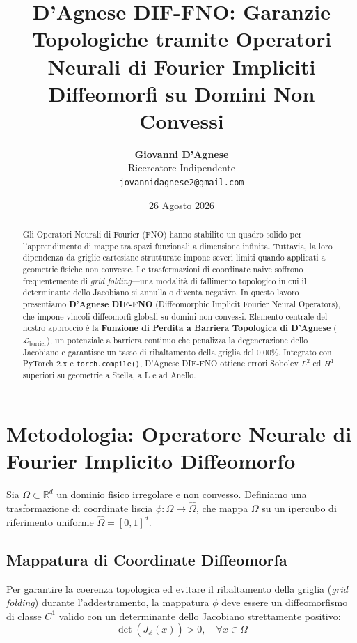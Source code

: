 \documentclass[11pt,a4paper]{article}
\title{\textbf{D'Agnese DIF-FNO: Garanzie Topologiche tramite Operatori Neurali di Fourier Impliciti Diffeomorfi su Domini Non Convessi}}
\author{\textbf{Giovanni D'Agnese} \\ Ricercatore Indipendente \\ \texttt{jovannidagnese2@gmail.com}}
\date{26 Agosto 2026}
\begin{document}
\maketitle

\begin{abstract}
Gli Operatori Neurali di Fourier (FNO) hanno stabilito un quadro solido per l'apprendimento di mappe tra spazi funzionali a dimensione infinita. Tuttavia, la loro dipendenza da griglie cartesiane strutturate impone severi limiti quando applicati a geometrie fisiche non convesse. Le trasformazioni di coordinate naive soffrono frequentemente di \textit{grid folding}—una modalità di fallimento topologico in cui il determinante dello Jacobiano si annulla o diventa negativo. In questo lavoro presentiamo \textbf{D'Agnese DIF-FNO} (Diffeomorphic Implicit Fourier Neural Operators), che impone vincoli diffeomorfi globali su domini non convessi. Elemento centrale del nostro approccio è la \textbf{Funzione di Perdita a Barriera Topologica di D'Agnese} ($\mathcal{L}_{\text{barrier}}$), un potenziale a barriera continuo che penalizza la degenerazione dello Jacobiano e garantisce un tasso di ribaltamento della griglia del 0,00\%. Integrato con PyTorch 2.x e \texttt{torch.compile()}, D'Agnese DIF-FNO ottiene errori Sobolev $L^2$ ed $H^1$ superiori su geometrie a Stella, a L e ad Anello.
\end{abstract}

\section{Metodologia: Operatore Neurale di Fourier Implicito Diffeomorfo}
\label{sec:theory}

Sia $\Omega \subset \mathbb{R}^d$ un dominio fisico irregolare e non convesso. Definiamo una trasformazione di coordinate liscia $\phi: \Omega \to \hat{\Omega}$, che mappa $\Omega$ su un ipercubo di riferimento uniforme $\hat{\Omega} = [0,1]^d$.

\subsection{Mappatura di Coordinate Diffeomorfa}
Per garantire la coerenza topologica ed evitare il ribaltamento della griglia (\textit{grid folding}) durante l'addestramento, la mappatura $\phi$ deve essere un diffeomorfismo di classe $C^1$ valido con un determinante dello Jacobiano strettamente positivo:
\begin{equation}
\det(J_\phi(x)) > 0, \quad \forall x \in \Omega
\end{equation}
\end{document}
